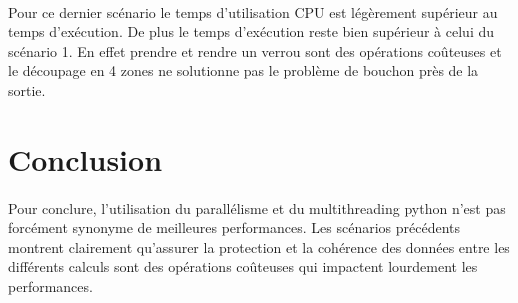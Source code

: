 \documentclass[12pt,oneside,a4paper]{article}
\begin{document}
\paragraph{}
Pour ce dernier scénario le temps d'utilisation CPU est légèrement supérieur au temps d'exécution. De 
plus le temps d'exécution reste bien supérieur à celui du scénario 1. En effet prendre et rendre un verrou
sont des opérations coûteuses et le découpage en 4 zones ne solutionne pas le problème de bouchon près de la sortie.

\section{Conclusion}
\paragraph{}
Pour conclure, l'utilisation du parallélisme et du multithreading python n'est pas forcément synonyme
de meilleures performances. Les scénarios précédents montrent clairement qu'assurer la protection
et la cohérence des données entre les différents calculs sont des opérations coûteuses qui impactent lourdement
les performances.
\end{document}
